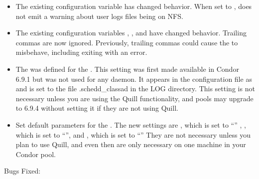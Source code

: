 \begin{itemize}

\item The existing configuration variable  has 
changed behavior. When set to ,
 does not emit a warning about user logs files being on NFS.

\item The existing 
configuration variables ,
, and  
have changed behavior.
Trailing commas are now ignored.
Previously, trailing commas could cause the  to misbehave,
including exiting with an error.

\item The  was defined for the .
This setting was first made available in Condor 6.9.1 but was not used for
any daemon.  
It appears in the configuration file as  and
is set to the file .schedd\_classad in the LOG directory. This setting is 
not necessary unless you are using the Quill functionality, and pools may 
upgrade to 6.9.4 without setting it if they are not using Quill. 
  
\item Set default parameters for the . The new settings
are , which is set to ``''
, , which is set to ``'', and
, which is set to ``''
They are not necessary unless you plan to use Quill, and even then are
only necessary on one machine in your Condor pool. 
\end{itemize}


\noindent Bugs Fixed:


